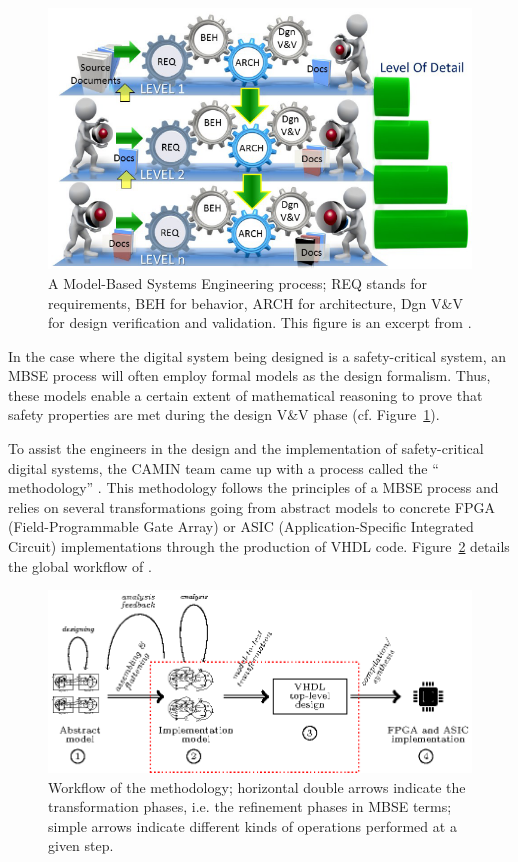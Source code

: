 \documentclass[pdflatex,sn-mathphys]{sn-jnl}%
\theoremstyle{thmstyleone}%
\theoremstyle{thmstyletwo}%
\theoremstyle{thmstylethree}%
\begin{document}
\begin{figure}[H] \centering
\includegraphics[keepaspectratio,width=.7\textwidth]{MBSE-ps.png}
  \caption[A Model-Based Systems Engineering process.]{A Model-Based
Systems Engineering process; REQ stands for requirements, BEH for
behavior, ARCH for architecture, Dgn V\&V for design verification and
validation. This figure is an excerpt from \cite{Long2011}.}
  \label{fig:MBSE-ps}
\end{figure}

In the case where the digital system being designed is a
safety-critical system, an MBSE process will often employ formal
models as the design formalism. Thus, these models enable a certain
extent of mathematical reasoning to prove that safety properties are
met during the design V\&V phase (cf. Figure~\ref{fig:MBSE-ps}).

To assist the engineers in the design and the implementation of
safety-critical digital systems, the CAMIN team came up with a process
called the ``\hilecop{} methodology'' \cite{Andreu2009}.  This
methodology follows the principles of a MBSE process and relies on
several transformations going from abstract models to concrete FPGA
(Field-Programmable Gate Array) or ASIC (Application-Specific
Integrated Circuit) implementations through the production of VHDL
code. Figure~\ref{fig:hilecop-wf} details the global workflow of
\hilecop{}.

\begin{figure}[H]
\centering
\includegraphics[keepaspectratio=true,width=\textwidth]{hilecop-wf.eps}
\caption[Workflow of the \hilecop{} methodology.]{Workflow of the
  \hilecop{} methodology; horizontal double arrows indicate the
  transformation phases, i.e. the refinement phases in MBSE terms;
  simple arrows indicate different kinds of operations performed at a
  given step.}
\label{fig:hilecop-wf}
\end{figure}
\end{document}
